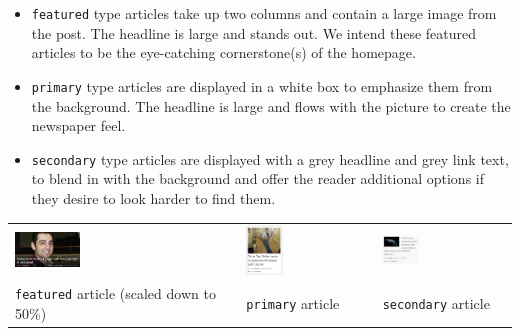 \documentclass[11pt,letterpaper]{article}
\begin{document}
\begin{itemize}
\item \verb+featured+ type articles take up two columns and contain a large image from the post. The headline is large and stands out. We intend these featured articles to be the eye-catching cornerstone(s) of the homepage.
\item \verb+primary+ type articles are displayed in a white box to emphasize them from the background. The headline is large and flows with the picture to create the newspaper feel.
\item \verb+secondary+ type articles are displayed with a grey headline and grey link text, to blend in with the background and offer the reader additional options if they desire to look harder to find them.
\end{itemize}

\begin{tabular}{ m{} m{} m{} }
\includegraphics[width=0.3\textwidth]{img/featured-image.png} &
\includegraphics[width=0.3\textwidth]{img/primary-image.png} &
\includegraphics[width=0.3\textwidth]{img/secondary-image.png} \\
\centering\verb+featured+ article (scaled down to 50\%) & \centering\verb+primary+ article & \centering\verb+secondary+ article
\end{tabular}
\vspace{1.2em}
\end{document}
